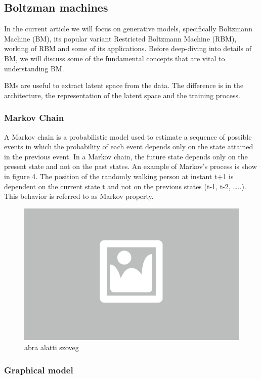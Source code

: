 \subsection{Boltzman machines}

In the current article we will focus on generative models, specifically Boltzmann Machine (BM), its popular variant Restricted Boltzmann Machine (RBM), working of RBM and some of its applications. Before deep-diving into details of BM, we will discuss some of the fundamental concepts that are vital to understanding BM. 

BMs are useful to extract latent space from the data. The difference is in the architecture, the representation of the latent space and the training process. 

\subsubsection{Markov Chain}

A Markov chain is a probabilistic model used to estimate a sequence of possible events in which the probability of each event depends only on the state attained in the previous event.  In a Markov chain, the future state depends only on the present state and not on the past states. An example of Markov’s process is show in figure 4.  The position of the randomly walking person at instant t+1 is dependent on the current state t and not on the previous states (t-1, t-2, …..). This behavior is referred to as Markov property.

\begin{figure}[ht]
	\centering
	\includegraphics[width=0.65\columnwidth]{figures/abra.png}
	\caption{abra alatti szoveg}
\end{figure}


\subsubsection{Graphical model}


